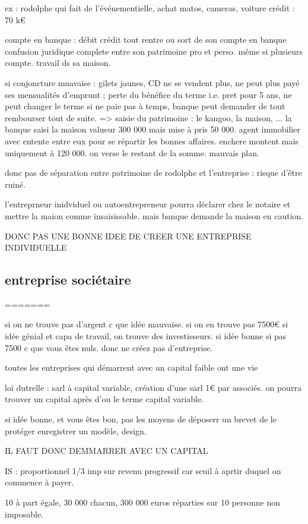 \documentclass[a4paper,12pt]{article}
\begin{document}
ex : rodolphe qui fait de l'événementielle, achat matos, cameras, voiture
crédit : 70 k€

compte en banque : débit crédit tout rentre ou sort de son compte en banque
confusion juridique complete entre son patrimoine pro et perso. même si plusieurs compte.
travail ds sa maison.

si conjoncture muavaise : gilets jaunes, CD ne se vendent plus, ne peut plus payé
ses mensualités d'emprunt ; perte du bénéfice du terme i.e. pret pour 5 ans, ne peut changer le terme
si ne paie pas à temps, banque peut demander de tout rembourser tout de suite.
=> saisie du patrimoine : le kangoo, la maison, ...
la banque saisi la maison valueur 300 000 mais mise à pris 50 000. agent immobilier avec entente entre eux pour se répartir les bonnes affaires. enchere montent mais uniquement à 120 000. on verse le restant de la somme.
mauvais plan.

donc pas de séparation entre patrimoine de rodolphe et l'entreprise : risque d'être ruiné.

l'entreprneur inidviduel ou autoentrepreneur pourra déclarer chez le notaire et mettre la maion
comme insaisissable.
mais banque demande la maison en caution.

DONC PAS UNE BONNE IDEE DE CREER UNE ENTREPRISE INDIVIDUELLE
\subsection{entreprise sociétaire}
=======
 
si on ne trouve pas d'argent c que idée mauvaise. si on en trouve pas 7500€
si idée génial et capa de travail, on trouve des investisseurs.
si idée bonne si pas 7500 c que vous êtes nuls.
donc ne créez pas d'entreprise.

toutes les entreprises qui démarrent avec un capital faible ont une vie

loi dutrelle : sarl à capital variable, création d'une sarl 1€ par associés.
on pourra trouver un capital après d'ou le terme capital variable.


si idée bonne, et vous êtes bon, pas les moyens de déposerr un brevet de le protéger
enregistrer un modèle, design.

IL FAUT DONC DEMMARRER AVEC UN CAPITAL

IS : proportionnel 1/3
imp sur revenu progressif car seuil à aprtir duquel on commence à payer.

10 à part égale, 30 000 chacun, 300 000 euros réparties sur 10 personne non imposable.
\end{document}
